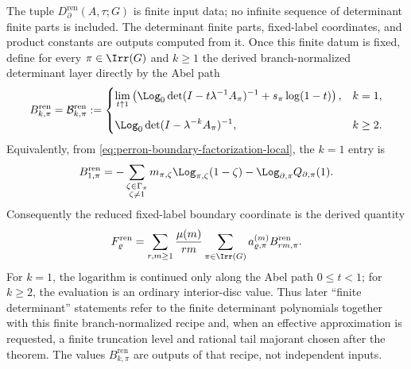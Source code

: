 \begin{definition}
  The tuple \(D_{\partial}^{\mathrm{ren}}(A,\tau;G)\) is finite input data;
  no infinite sequence of determinant finite parts is included.  The
  determinant finite parts, fixed-label coordinates, and product constants are
  outputs computed from it.  Once this finite datum is fixed, define for every
  \(\pi\in\Irr(G)\) and \(k\ge1\) the derived branch-normalized determinant
  layer directly by the Abel path
  \begin{equation}\label{eq:perron-boundary-renormalized-b-data}
    B_{k,\pi}^{\mathrm{ren}}
    =\mathcal B_{k,\pi}^{\mathrm{ren}}:=
    \begin{cases}
      \displaystyle
      \lim_{t\uparrow1}
      \left(
        \Log_0\det(I-t\lambda^{-1}A_\pi)^{-1}
        +s_\pi\log(1-t)
      \right), & k=1,\\[1.2em]
      \displaystyle
      \Log_0\det(I-\lambda^{-k}A_\pi)^{-1}, & k\ge2.
    \end{cases}
  \end{equation}
  Equivalently, from \eqref{eq:perron-boundary-factorization-local}, the
  \(k=1\) entry is
  \begin{equation}\label{eq:perron-boundary-renormalized-b1-factor}
    B_{1,\pi}^{\mathrm{ren}}
    =
    -\sum_{\substack{\zeta\in\Gamma_\pi\\\zeta\ne1}}
      m_{\pi,\zeta}\Log_{\pi,\zeta}(1-\zeta)
    -\Log_{\partial,\pi} Q_{\partial,\pi}(1).
  \end{equation}
  Consequently the reduced fixed-label boundary coordinate is the derived
  quantity
  \begin{equation}\label{eq:perron-boundary-fren-derived-data}
    F_\varrho^{\mathrm{ren}}
    =
    \sum_{r,m\ge1}\frac{\mu(m)}{rm}
      \sum_{\pi\in\Irr(G)}
        a_{\varrho,\pi}^{(m)}B_{rm,\pi}^{\mathrm{ren}}.
  \end{equation}
  For \(k=1\), the logarithm is continued only along the Abel path
  \(0\le t<1\); for \(k\ge2\), the evaluation is an ordinary interior-disc
  value.  Thus later ``finite determinant'' statements refer to the finite
  determinant polynomials together with this finite branch-normalized recipe
  and, when an effective approximation is requested, a finite truncation level
  and rational tail majorant chosen after the theorem.  The values
  \(B_{k,\pi}^{\mathrm{ren}}\) are outputs of that recipe, not independent
  inputs.
\end{definition}

